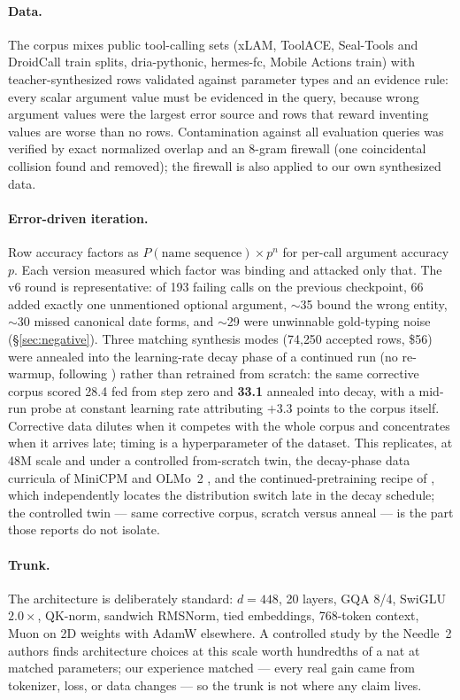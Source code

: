 \documentclass[10pt]{article}
\newcommand{\needle}{Needle~2}
\begin{document}
\paragraph{Data.} The corpus mixes public tool-calling sets (xLAM, ToolACE,
Seal-Tools and DroidCall train splits, dria-pythonic, hermes-fc, Mobile
Actions train) with teacher-synthesized rows validated against parameter
types and an evidence rule: every scalar argument value must be evidenced in
the query, because wrong argument values were the largest error source and
rows that reward inventing values are worse than no rows. Contamination
against all evaluation queries was verified by exact normalized overlap and an
8-gram firewall (one coincidental collision found and removed); the firewall
is also applied to our own synthesized data.

\paragraph{Error-driven iteration.} Row accuracy factors as
$P(\text{name sequence})\times p^{n}$ for per-call argument accuracy $p$. Each
version measured which factor was binding and attacked only that. The v6
round is representative: of 193 failing calls on the previous checkpoint, 66
added exactly one unmentioned optional argument, $\sim$35 bound the wrong
entity, $\sim$30 missed canonical date forms, and $\sim$29 were unwinnable
gold-typing noise (\S\ref{sec:negative}). Three matching synthesis modes
(74{,}250 accepted rows, \$56) were annealed into the learning-rate decay
phase of a continued run (no re-warmup, following \citealp{parmar2024}) rather
than retrained from scratch: the same corrective corpus scored 28.4 fed from
step zero and \textbf{33.1} annealed into decay, with a mid-run probe at
constant learning rate attributing $+3.3$ points to the corpus itself.
Corrective data dilutes when it competes with the whole corpus and
concentrates when it arrives late; timing is a hyperparameter of the dataset.
This replicates, at 48M scale and under a controlled from-scratch twin, the
decay-phase data curricula of MiniCPM \citep{minicpm} and OLMo~2
\citep{olmo2}, and the continued-pretraining recipe of \citet{parmar2024},
which independently locates the distribution switch late in the decay
schedule; the controlled twin --- same corrective corpus, scratch versus
anneal --- is the part those reports do not isolate.

\paragraph{Trunk.} The architecture is deliberately standard: $d{=}448$, 20
layers, GQA 8/4, SwiGLU $2.0\times$, QK-norm, sandwich RMSNorm, tied
embeddings, 768-token context, Muon \citep{muon} on 2D weights with AdamW
elsewhere. A
controlled study by the \needle{} authors \citep{san} finds architecture
choices at this scale worth hundredths of a nat at matched parameters; our
experience matched --- every real gain came from tokenizer, loss, or data
changes --- so the trunk is not where any claim lives.
\end{document}
